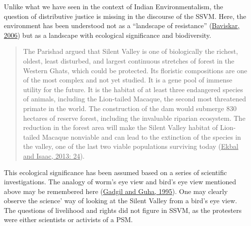 \documentclass[twoside, 13pt]{article}
\begin{document}
{{{{\fontsize{12}{14}\selectfont Unlike what we have seen in the context of Indian Environmentalism, the question of distributive justice is missing in the discourse of the SSVM. Here, the environment has been understood not as a “landscape of resistance” (\underline{Baviskar, 2006}) but as a landscape with ecological significance and biodiversity.

\begin{quote}
The Parishad argued that Silent Valley is one of biologically the richest, oldest, least disturbed, and largest continuous stretches of forest in the Western Ghats, which could be protected. Its floristic compositions are one of the most complex and not yet studied. It is a gene pool of immense utility for the future. It is the habitat of at least three endangered species of animals, including the Lion-tailed Macaque, the second most threatened primate in the world. The construction of the dam would submerge 830 hectares of reserve forest, including the invaluable riparian ecosystem. The reduction in the forest area will make the Silent Valley habitat of Lion-tailed Macaque nonviable and can lead to the extinction of the species in the valley, one of the last two viable populations surviving today (\underline{Ekbal and Isaac, 2013: 24}).
\end{quote}

This ecological significance has been assumed based on a series of scientific investigations. The analogy of worm’s eye view and bird’s eye view mentioned above may be remembered here (\underline{Gadgil and Guha, 1995}). One may clearly observe the science’ way of looking at the Silent Valley from a bird’s eye view. The questions of livelihood and rights did not figure in SSVM, as the protesters were either scientists or activists of a PSM.

}}}}
\end{document}
